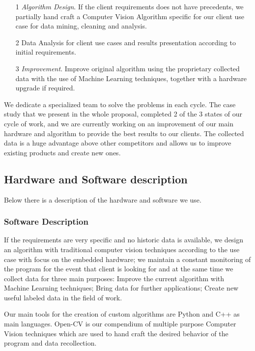 \documentclass[fleqn,12pt]{SelfArx} %
\begin{document}
\begin{itemize}

\item[1] \textit{Algorithm Design}. If the client requirements does not have precedents, we partially hand craft a Computer Vision Algorithm specific for our client use case for data mining, cleaning and analysis.
\item[2] Data Analysis for client use cases and results presentation according to initial requirements.
\item[3] \textit{Improvement}. Improve original algorithm using the proprietary collected data with the use of Machine Learning techniques, together with a hardware upgrade if required.
     
\end{itemize}

We dedicate a specialized team to solve the problems in each cycle. The case study that we present in the whole proposal, completed 2 of the 3 states of our cycle of work, and we are currently working on an improvement of our main hardware and algorithm to provide the best results to our clients. The collected data is a huge advantage above other competitors and allows us to improve existing products and create new ones.

\subsection{Hardware and Software description}
Below there is a description of the hardware and software we use.

\subsubsection{Software Description}
If the requirements are very specific and no historic data is available, we design an algorithm with traditional computer vision techniques according to the use case with focus on the embedded hardware; we maintain a constant monitoring of the program for the event that client is looking for and at the same time we collect data for three main purposes: Improve the current algorithm with Machine Learning techniques; Bring data for further applications; Create new useful labeled data in the field of work.

Our main tools for the creation of custom algorithms are Python and C++ as main languages. Open-CV is our compendium of multiple purpose Computer Vision techniques which are used to hand craft the desired behavior of the program and data recollection.
\end{document}
